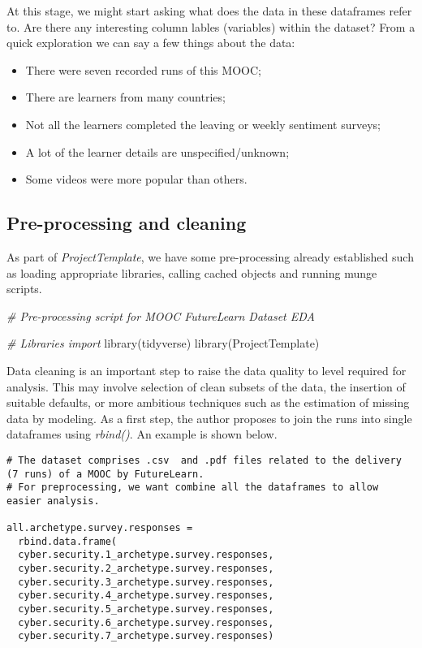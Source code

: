 \documentclass[
]{article}
\newenvironment{Shaded}{\begin{snugshade}}{\end{snugshade}}
\newcommand{\CommentTok}[1]{\textcolor[rgb]{0.56,0.35,0.01}{\textit{#1}}}
\newcommand{\FunctionTok}[1]{\textcolor[rgb]{0.00,0.00,0.00}{#1}}
\newcommand{\NormalTok}[1]{#1}
\begin{document}
At this stage, we might start asking what does the data in these
dataframes refer to. Are there any interesting column lables (variables)
within the dataset? From a quick exploration we can say a few things
about the data:

\begin{itemize}
\item
  There were seven recorded runs of this MOOC;
\item
  There are learners from many countries;
\item
  Not all the learners completed the leaving or weekly sentiment
  surveys;
\item
  A lot of the learner details are unspecified/unknown;
\item
  Some videos were more popular than others.
\end{itemize}

\hypertarget{pre-processing-and-cleaning}{%
\subsection{Pre-processing and
cleaning}\label{pre-processing-and-cleaning}}

As part of \emph{ProjectTemplate}, we have some pre-processing already
established such as loading appropriate libraries, calling cached
objects and running munge scripts.

\begin{Shaded}
\begin{Highlighting}[]
\CommentTok{\# Pre{-}processing script for MOOC FutureLearn Dataset EDA}

\CommentTok{\# Libraries import}
    \FunctionTok{library}\NormalTok{(tidyverse)}
    \FunctionTok{library}\NormalTok{(ProjectTemplate)}
\end{Highlighting}
\end{Shaded}

Data cleaning is an important step to raise the data quality to level
required for analysis. This may involve selection of clean subsets of
the data, the insertion of suitable defaults, or more ambitious
techniques such as the estimation of missing data by modeling. As a
first step, the author proposes to join the runs into single dataframes
using \emph{rbind()}. An example is shown below.

\begin{verbatim}
# The dataset comprises .csv  and .pdf files related to the delivery (7 runs) of a MOOC by FutureLearn. 
# For preprocessing, we want combine all the dataframes to allow easier analysis.

all.archetype.survey.responses = 
  rbind.data.frame(
  cyber.security.1_archetype.survey.responses,
  cyber.security.2_archetype.survey.responses,
  cyber.security.3_archetype.survey.responses,
  cyber.security.4_archetype.survey.responses,
  cyber.security.5_archetype.survey.responses,
  cyber.security.6_archetype.survey.responses,
  cyber.security.7_archetype.survey.responses)
\end{verbatim}
\end{document}
